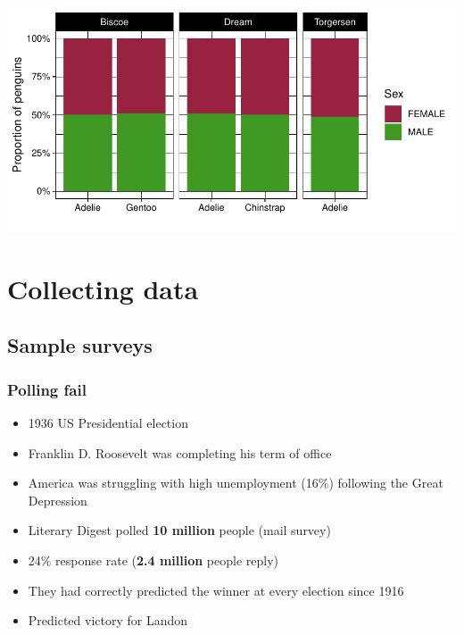 \documentclass[a4paper]{article}\usepackage[]{graphicx}\usepackage[]{xcolor}
\makeatletter
\def\maxwidth{ %
  \ifdim\Gin@nat@width>\linewidth
    \linewidth
  \else
    \Gin@nat@width
  \fi
}
\makeatother
\begin{document}
\begin{Schunk}


{\centering \includegraphics[width=\maxwidth]{figure/listings-unnamed-chunk-11-1} 

}

\end{Schunk}
\section{Collecting data}\label{sec:2}
\subsection{Sample surveys}
\subsubsection{Polling fail}
\begin{itemize}
    \item 1936 US Presidential election
    \item Franklin D. Roosevelt was completing his term of office
    \item America was struggling with high unemployment (16\%) following the Great Depression
    \item Literary Digest polled \textbf{10 million} people (mail survey)
    \item 24\% response rate (\textbf{2.4 million} people reply)
    \item They had correctly predicted the winner at every election since 1916
    \item Predicted victory for \textcolor{myred}{Landon}
\end{itemize}
\end{document}
